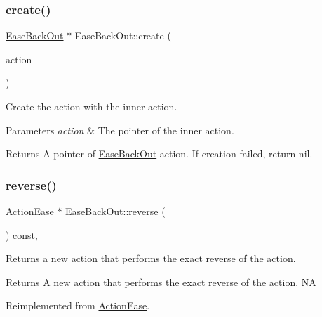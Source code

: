 \subsubsection{\texorpdfstring{create()}{create()}}
{\footnotesize\ttfamily \hyperlink{classEaseBackOut}{Ease\+Back\+Out} $\ast$ Ease\+Back\+Out\+::create (\begin{DoxyParamCaption}\item[{\hyperlink{classActionInterval}{Action\+Interval} $\ast$}]{action }\end{DoxyParamCaption})\hspace{0.3cm}{\ttfamily [static]}}



Create the action with the inner action. 


\begin{DoxyParams}{Parameters}
{\em action} & The pointer of the inner action. \\
\hline
\end{DoxyParams}
\begin{DoxyReturn}{Returns}
A pointer of \hyperlink{classEaseBackOut}{Ease\+Back\+Out} action. If creation failed, return nil. 
\end{DoxyReturn}
\mbox{\label{classEaseBackOut_acf37a76a71da70fd233dd28934332316}} 
\subsubsection{\texorpdfstring{reverse()}{reverse()}}
{\footnotesize\ttfamily \hyperlink{classActionEase}{Action\+Ease} $\ast$ Ease\+Back\+Out\+::reverse (\begin{DoxyParamCaption}\item[{void}]{ }\end{DoxyParamCaption}) const\hspace{0.3cm}{\ttfamily [override]}, {\ttfamily [virtual]}}

Returns a new action that performs the exact reverse of the action.

\begin{DoxyReturn}{Returns}
A new action that performs the exact reverse of the action.  NA 
\end{DoxyReturn}


Reimplemented from \hyperlink{classActionEase_ab99eb083fa033fae1d6c948fdc730782}{Action\+Ease}.

